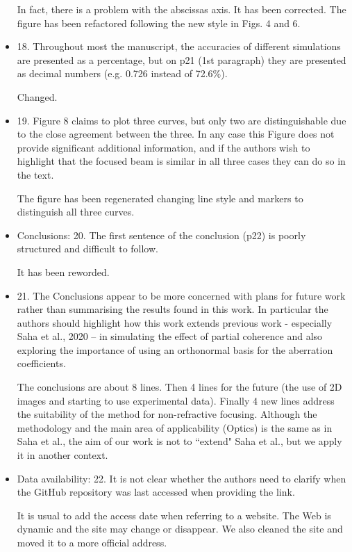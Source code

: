 \documentclass[11pt]{letter} %
\newcommand{\inred}[1]{{\color{red}#1}}
\begin{document}
\begin{letter}{}
\begin{itemize}
    \inred{In fact, there is a problem with the abscissas axis. It has been corrected. The figure has been refactored following the new style in Figs. 4 and 6. }
    
    \item 18. Throughout most the manuscript, the accuracies of different simulations are presented as a percentage, but on p21 (1st paragraph) they are presented as decimal numbers (e.g. 0.726 instead of 72.6\%).
    
    \inred{Changed.}
    
    \item 19. Figure 8 claims to plot three curves, but only two are distinguishable due to the close agreement between the three. In any case this Figure does not provide significant additional information, and if the authors wish to highlight that the focused beam is similar in all three cases they can do so in the text.
    
    \inred{The figure has been regenerated changing line style and markers to distinguish all three curves.}
    
    \item Conclusions: 20. The first sentence of the conclusion (p22) is poorly structured and difficult to follow.
    
    \inred{It has been reworded.}
    
    \item 21. The Conclusions appear to be more concerned with plans for future work rather than summarising the results found in this work. In particular the authors should highlight how this work extends previous work - especially Saha et al., 2020 – in simulating the effect of partial coherence and also exploring the importance of using an orthonormal basis for the aberration coefficients.
    
    \inred{The conclusions are about 8 lines. Then 4 lines for the future (the use of 2D images and starting to use experimental data). Finally 4 new lines address the suitability of the method for non-refractive focusing. Although the methodology and the main area of applicability (Optics) is the same as in Saha et al., the aim of our work is not to ``extend" Saha et al., but we apply it in another context. }
    
    \item Data availability: 22. It is not clear whether the authors need to clarify when the GitHub repository was last accessed when providing the link. 
    
    \inred{It is usual to add the access date when referring to a website. The Web is dynamic and the site may change or disappear. We also cleaned the site and moved it to a more official address. }
    

\end{itemize}
\end{letter}
\end{document}
